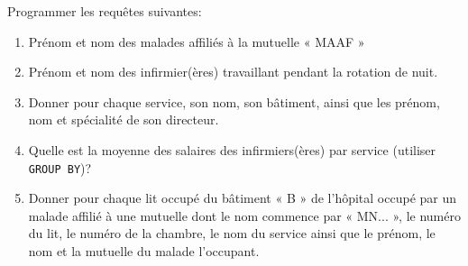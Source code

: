 \documentclass[a4paper,12pt,french]{book}
\begin{document}
\begin{exercice}
	Programmer les requêtes suivantes:
	\begin{enumerate}
		\item 	Prénom et nom des malades affiliés à la mutuelle « MAAF »
		\item 	Prénom et nom des infirmier(ères) travaillant pendant la rotation de nuit.
		\item 	Donner pour chaque service, son nom, son bâtiment, ainsi que les prénom, nom et
		spécialité de son directeur.
		\item 	Quelle est la moyenne des salaires des infirmiers(ères) par service (utiliser \texttt{GROUP BY})?
      	\item 	Donner pour chaque lit occupé du bâtiment « B » de l’hôpital occupé par un malade
        		affilié à une mutuelle dont le nom commence par « MN... », le numéro du lit, le
        		numéro de la chambre, le nom du service ainsi que le prénom, le nom et la mutuelle
        		du malade l’occupant.
	\end{enumerate}
\end{exercice}
\end{document}
